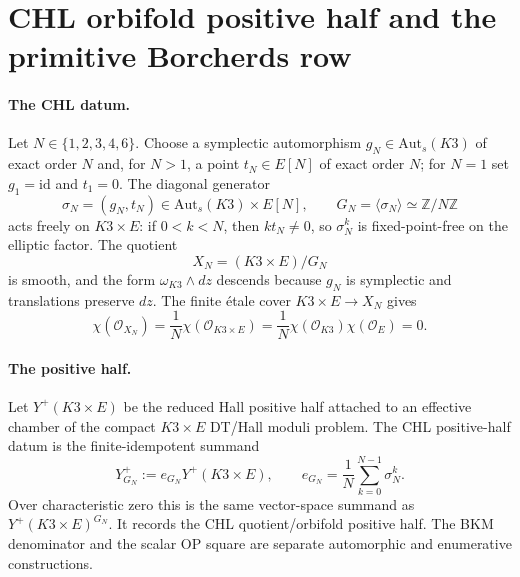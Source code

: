 \providecommand{\bC}{\mathbb{C}}
\providecommand{\bZ}{\mathbb{Z}}
\providecommand{\bQ}{\mathbb{Q}}
\providecommand{\Aut}{\mathrm{Aut}}
\providecommand{\Auts}{\mathrm{Aut}_s}
\providecommand{\Fix}{\mathrm{Fix}}
\providecommand{\Hilb}{\mathrm{Hilb}}
\providecommand{\Coh}{\mathrm{Coh}}
\providecommand{\Sp}{\mathrm{Sp}}
\providecommand{\DT}{\mathrm{DT}}
\providecommand{\red}{\mathrm{red}}
\providecommand{\kch}{\kappa_{\mathrm{ch}}}
\providecommand{\kBKM}{\kappa_{\mathrm{BKM}}}
\providecommand{\kcat}{\kappa_{\mathrm{cat}}}
\providecommand{\kfib}{\kappa_{\mathrm{fiber}}}
\providecommand{\Yp}{Y^{+}}

\section*{CHL orbifold positive half and the primitive Borcherds row}

\paragraph{The CHL datum.}
Let $N\in\{1,2,3,4,6\}$.  Choose a symplectic automorphism
$g_N\in\Auts(K3)$ of exact order $N$ and, for $N>1$, a point
$t_N\in E[N]$ of exact order $N$; for $N=1$ set $g_1=\mathrm{id}$ and
$t_1=0$.  The diagonal generator
\[
  \sigma_N=(g_N,t_N)\in \Auts(K3)\times E[N],
  \qquad
  G_N=\langle\sigma_N\rangle\simeq \bZ/N\bZ
\]
acts freely on $K3\times E$: if $0<k<N$, then $k t_N\neq 0$, so
$\sigma_N^k$ is fixed-point-free on the elliptic factor.  The quotient
\[
  X_N=(K3\times E)/G_N
\]
is smooth, and the form $\omega_{K3}\wedge dz$ descends because $g_N$
is symplectic and translations preserve $dz$.  The finite \'etale cover
$K3\times E\to X_N$ gives
\[
  \chi(\mathcal{O}_{X_N})
  =
  \frac{1}{N}\chi(\mathcal{O}_{K3\times E})
  =
  \frac{1}{N}\chi(\mathcal{O}_{K3})\chi(\mathcal{O}_{E})
  =
  0 .
\]

\paragraph{The positive half.}
Let $\Yp(K3\times E)$ be the reduced Hall positive half attached to an
effective chamber of the compact $K3\times E$ DT/Hall moduli problem.
The CHL positive-half datum is the finite-idempotent summand
\[
  \Yp_{G_N}
  :=
  e_{G_N}\Yp(K3\times E),
  \qquad
  e_{G_N}=\frac{1}{N}\sum_{k=0}^{N-1}\sigma_N^k .
\]
Over characteristic zero this is the same vector-space summand as
$\Yp(K3\times E)^{G_N}$.  It records the CHL quotient/orbifold positive
half.  The BKM denominator and the scalar OP square are separate
automorphic and enumerative constructions.

